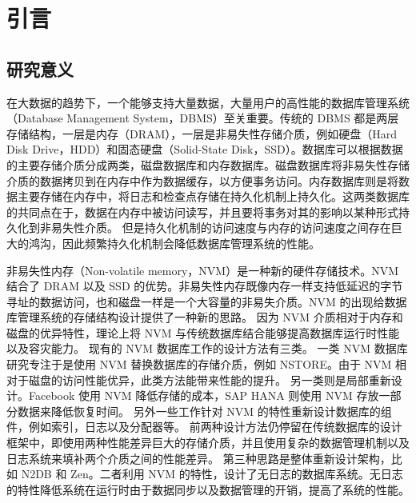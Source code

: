
\chapter{引言}

\section{研究意义}

在大数据的趋势下，一个能够支持大量数据，大量用户的高性能的数据库管理系统（Database Management System，DBMS）至关重要。传统的 DBMS 都是两层存储结构，一层是内存（DRAM），一层是非易失性存储介质，例如硬盘（Hard Disk Drive，HDD）和固态硬盘（Solid-State Disk，SSD）。数据库可以根据数据的主要存储介质分成两类，磁盘数据库和内存数据库。磁盘数据库将非易失性存储介质的数据拷贝到在内存中作为数据缓存，以方便事务访问。内存数据库则是将数据主要存储在内存中，将日志和检查点存储在持久化机制上持久化。这两类数据库的共同点在于，数据在内存中被访问读写，并且要将事务对其的影响以某种形式持久化到非易失性介质。
但是持久化机制的访问速度与内存的访问速度之间存在巨大的鸿沟，因此频繁持久化机制会降低数据库管理系统的性能。

非易失性内存（Non-volatile memory，NVM）是一种新的硬件存储技术。NVM 结合了 DRAM 以及 SSD 的优势。非易失性内存既像内存一样支持低延迟的字节寻址的数据访问，也和磁盘一样是一个大容量的非易失介质。NVM 的出现给数据库管理系统的存储结构设计提供了一种新的思路。
因为 NVM 介质相对于内存和磁盘的优异特性，理论上将 NVM 与传统数据库结合能够提高数据库运行时性能以及容灾能力。
现有的 NVM 数据库工作的设计方法有三类。
一类 NVM 数据库研究专注于是使用 NVM 替换数据库的存储介质，例如 NSTORE\cite{arulraj_lets_2015}。由于 NVM 相对于磁盘的访问性能优异，此类方法能带来性能的提升。
另一类则是局部重新设计。Facebook 使用 NVM 降低存储的成本\cite{facebook}，SAP HANA 则使用 NVM 存放一部分数据来降低恢复时间\cite{andrei_sap_2017}。
另外一些工作针对 NVM 的特性重新设计数据库的组件，例如索引\cite{nv-tree,chen_persistent_2015,ma_roart_2021}，日志\cite{wbl}以及分配器\cite{pmdk,bhandari_makalu_2016}等。
前两种设计方法仍停留在传统数据库的设计框架中，即使用两种性能差异巨大的存储介质，并且使用复杂的数据管理机制以及日志系统来填补两个介质之间的性能差异。
第三种思路是整体重新设计架构，比如 N2DB\cite{liu_graduate} 和 Zen\cite{liu_zen_2021}。二者利用 NVM 的特性，设计了无日志的数据库系统。无日志的特性降低系统在运行时由于数据同步以及数据管理的开销，提高了系统的性能。


